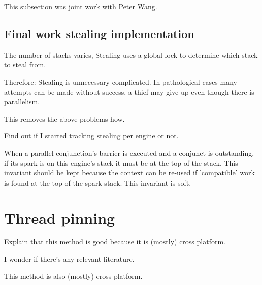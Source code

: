 



This subsection was joint work with Peter Wang.


\subsection{Final work stealing implementation}

The number of stacks varies,
Stealing uses a global lock to determine which stack to steal from.

Therefore:
Stealing is unnecessary complicated.
In pathological cases many attempts can be made without success,
a thief may give up even though there is parallelism.

This removes the above problems how.

Find out if I started tracking stealing per engine or not.

When a parallel conjunction's barrier is executed and a conjunct is
outstanding, if its spark is on this engine's stack it must be at the top of
the stack.
This invariant should be kept because the context can be re-used if
'compatible' work is found at the top of the spark stack.
This invariant is soft.


\section{Thread pinning}
\label{sec:thread_pinning}


Explain that this method is good because it is (mostly) cross platform.

I wonder if there's any relevant literature.

This method is also (mostly) cross platform.

